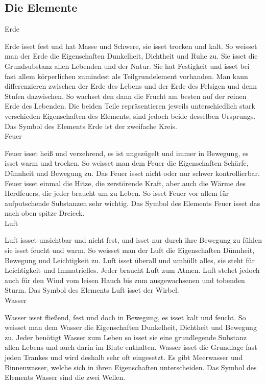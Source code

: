 \documentclass[a5paper,8pt]{book}
\begin{document}
\subsection{Die Elemente}

\noindent Erde\

Erde isset fest und hat Masse und Schwere, sie isset trocken und kalt. So weisset man der Erde die Eigenschaften  Dunkelheit, Dichtheit und Ruhe zu. Sie isset die Grundsubstanz 
allen Lebenden und der Natur. Sie hat Festigkeit und isset bei fast allem körperlichen zumindest als Teilgrundelement vorhanden. Man kann differenzieren zwischen der Erde des 
Lebens und der Erde des Felsigen und denn Stufen dazwischen. So wachset den dann die Frucht am besten auf der reinen Erde des Lebenden. Die beiden Teile repräsentieren jeweils 
unterschiedlich stark verschieden Eigenschaften des Elements, sind jedoch beide desselben Ursprungs. Das Symbol des Elements Erde ist der zweifache Kreis.\\

\noindent Feuer\

Feuer isset heiß und verzehrend, es ist ungezügelt und immer in Bewegung, es isset warm und trocken. So weisset man dem Feuer die Eigenschaften Schärfe, Dünnheit und Bewegung 
zu. Das Feuer isset nicht oder nur schwer kontrollierbar. Feuer isset einmal die Hitze, die zerstörende Kraft, aber auch die Wärme des Herdfeuers, die jeder braucht um zu Leben. 
So isset Feuer vor allem für aufputschende Substanzen sehr wichtig. Das Symbol des Elements Feuer isset das nach oben spitze Dreieck.\\

\noindent Luft\

Luft issset unsichtbar und nicht fest, und isset nur durch ihre Bewegung zu fühlen sie isset feucht und warm. So weisset man der Luft die Eigenschaften Dünnheit, Bewegung und 
Leichtigkeit zu. Luft isset überall und umhüllt alles, sie steht für Leichtigkeit und Immatrielles. Jeder braucht Luft zum Atmen. 
Luft stehet jedoch auch für den Wind vom leisen Hauch bis zum ausgewachsenen und tobenden Sturm. Das Symbol des Elements Luft isset der Wirbel.\\

\noindent Wasser\

Wasser isset fließend, fest und doch in Bewegung, es isset kalt und feucht. So weisset man dem Wasser die Eigenschaften Dunkelheit, Dichtheit und Bewegung zu. Jeder benötigt 
Wasser zum Leben so isset sie eine grundlegende Substanz allen Lebens und auch darin im Blute enthalten. Wasser isset die Grundlage fast jeden Trankes und wird deshalb sehr 
oft eingesetzt. Es gibt Meerwasser und Binnenwasser, welche sich in ihren Eigenschaften unterscheiden. Das Symbol des Elements Wasser sind die zwei Wellen.\\
\end{document}
